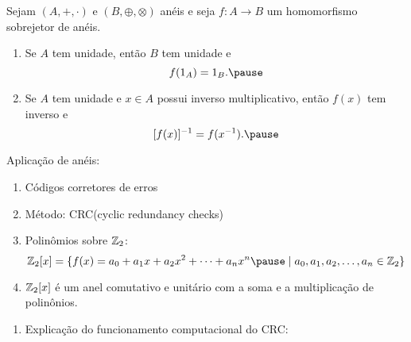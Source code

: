 \documentclass{beamer}
\begin{document}
    \begin{frame}
        \begin{proposicao}
            Sejam $(A, +, \cdot)$ e $(B, \oplus, \otimes)$ anéis \pause e seja $f : A \to B$ um homomorfismo sobrejetor de anéis.\pause
            \begin{enumerate}[label={\roman*})]
                \item Se $A$ tem unidade, \pause então $B$ tem unidade e\pause
                \[
                    f(1_A) = 1_B.\pause
                \]

                \vspace{.5cm}

                \item Se $A$ tem unidade \pause e $x \in A$ \pause possui inverso multiplicativo, \pause então $f(x)$ \pause tem inverso e\pause
                \[
                    [f(x)]^{-1} = f(x^{-1}).\pause
                \]

                \vspace{.5cm}
            \end{enumerate}
        \end{proposicao}
    \end{frame}

    \begin{frame}
        Aplicação de anéis:
        \begin{enumerate}[label={\arabic*})]
            \item Códigos corretores de erros\pause

            \item Método: CRC(cyclic redundancy checks)\pause

            \item Polinômios sobre $\mathbb{Z}_2$:\pause
                \[\z_2[x] = \{f(x) = a_0 + a_1x + a_2x^2 + \cdots + a_nx^n \pause \mid a_0, a_1, a_2, \dots, a_n \in \z_2\}\]\pause
            \item $\mathbb{Z}_2[x]$ é um anel comutativo e unitário com a soma e a multiplicação de polinônios.\pause

            \seti
        \end{enumerate}
    \end{frame}

    \begin{frame}
        \begin{enumerate}[label={\arabic*})]
            \conti
            \item Explicação do funcionamento computacional do CRC:\\
                \begin{center}
                \end{center}
        \end{enumerate}
    \end{frame}
\end{document}
